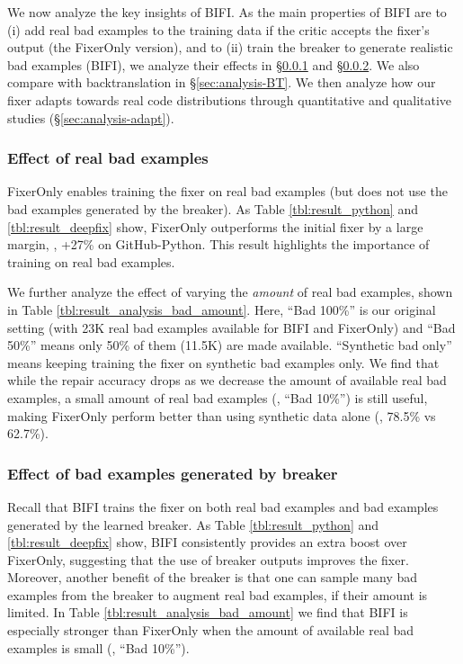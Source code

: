 We now analyze the key insights of BIFI. As the main properties of BIFI are to (i) add real bad examples to the training data if the critic accepts the fixer's output (the FixerOnly version), and to (ii) train the breaker to generate realistic bad examples (BIFI), we analyze their effects in \S \ref{sec:analysis-realbad} and \S \ref{sec:analysis-breaker}.
We also compare with backtranslation in \S \ref{sec:analysis-BT}.
We then analyze how our fixer adapts towards real code distributions through quantitative and qualitative studies (\S \ref{sec:analysis-adapt}).



\subsubsection{Effect of real bad examples}
\label{sec:analysis-realbad}

FixerOnly enables training the fixer on real bad examples (but does not use the bad examples generated by the breaker). As Table \ref{tbl:result_python} and \ref{tbl:result_deepfix} show, FixerOnly outperforms the initial fixer by a large margin, \eg, +27\% on GitHub-Python.
This result highlights the importance of training on real bad examples.


We further analyze the effect of varying the \textit{amount} of real bad examples, shown in Table \ref{tbl:result_analysis_bad_amount}. Here, ``Bad 100\%'' is our original setting (with 23K real bad examples available for BIFI and FixerOnly) and ``Bad 50\%'' means only 50\% of them (11.5K) are made available. ``Synthetic bad only'' means keeping training the fixer on synthetic bad examples only. We find that while the repair accuracy drops as we decrease the amount of available real bad examples, a small amount of real bad examples (\eg, ``Bad 10\%'') is still useful, making FixerOnly perform better than using synthetic data alone (\ie, 78.5\% vs 62.7\%).



\subsubsection{Effect of bad examples generated by breaker}
\label{sec:analysis-breaker}

Recall that BIFI trains the fixer on both real bad examples and bad examples generated by the learned breaker. As Table \ref{tbl:result_python} and \ref{tbl:result_deepfix} show, BIFI consistently provides an extra boost over FixerOnly, suggesting that the use of breaker outputs improves the fixer. Moreover, another benefit of the breaker is that one can sample many bad examples from the breaker to augment real bad examples, if their amount is limited.
In Table \ref{tbl:result_analysis_bad_amount} we find that BIFI is especially stronger than FixerOnly when the amount of available real bad examples is small (\eg, ``Bad 10\%'').

